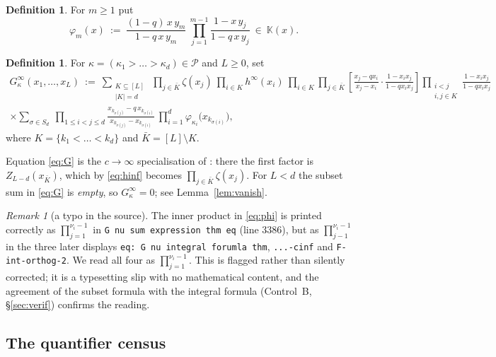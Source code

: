 \documentclass[11pt]{article}
\theoremstyle{definition}
\newtheorem{defn}[thm]{Definition}
\theoremstyle{remark}
\newtheorem{rem}[thm]{Remark}
\newcommand{\KK}{\mathbb{K}}
\newcommand{\PP}{\mathcal{P}}
\newcommand{\Gi}[1]{G^{\infty}_{#1}}
\begin{document}
\begin{defn}\label{def:phi}
For $m\ge 1$ put
\begin{equation}\label{eq:phi}
  \varphi_m(x)\ :=\ \frac{(1-q)\,x\,y_m}{1-q\,x\,y_m}\ \prod_{j=1}^{m-1}\frac{1-x\,y_j}{1-q\,x\,y_j}
  \ \in\ \KK(x).
\end{equation}
\end{defn}

\begin{defn}\label{def:G}
For $\kappa=(\kappa_1>\dots>\kappa_d)\in\PP$ and $L\ge 0$, set
\begin{multline}\label{eq:G}
  \Gi{\kappa}(x_1,\dots,x_L)\ :=\
  \sum_{\substack{K\subseteq[L]\\ |K|=d}}
  \ \prod_{j\in\bar K}\zeta(x_j)\ \prod_{i\in K}h^\infty(x_i)
  \ \prod_{i\in K}\prod_{j\in\bar K}
     \left[\frac{x_j-qx_i}{x_j-x_i}\cdot\frac{1-x_ix_j}{1-qx_ix_j}\right]
  \prod_{\substack{i<j\\ i,j\in K}}\frac{1-x_ix_j}{1-qx_ix_j}
  \\[2pt]
  \times \sum_{\sigma\in S_d}\ \prod_{1\le i<j\le d}
     \frac{x_{k_{\sigma(j)}}-q\,x_{k_{\sigma(i)}}}{x_{k_{\sigma(j)}}-x_{k_{\sigma(i)}}}
  \ \prod_{i=1}^{d}\varphi_{\kappa_i}\bigl(x_{k_{\sigma(i)}}\bigr),
\end{multline}
where $K=\{k_1<\dots<k_d\}$ and $\bar K=[L]\setminus K$.
\end{defn}

Equation \eqref{eq:G} is the $c\to\infty$ specialisation of \cite[Theorem \texttt{G nu thm},
line 3386]{GDMW}: there the first factor is $Z_{L-d}(x_{\bar K})$, which by \eqref{eq:hinf}
becomes $\prod_{j\in\bar K}\zeta(x_j)$. For $L<d$ the subset sum in \eqref{eq:G} is
\emph{empty}, so $\Gi{\kappa}=0$; see Lemma~\ref{lem:vanish}.

\begin{rem}[a typo in the source]\label{rem:typo}
The inner product in \eqref{eq:phi} is printed correctly as $\prod_{j=1}^{\nu_i-1}$ in
\texttt{G nu sum expression thm eq} (line 3386), but as $\prod_{j-1}^{\nu_i-1}$ in the three
later displays \texttt{eq: G nu integral forumla thm}, \texttt{...-cinf} and
\texttt{F-int-orthog-2}. We read all four as $\prod_{j=1}^{\nu_i-1}$. This is flagged rather
than silently corrected; it is a typesetting slip with no mathematical content, and the
agreement of the subset formula with the integral formula (Control~B, \S\ref{sec:verif})
confirms the reading.
\end{rem}

\subsection{The quantifier census}\label{sec:census}
\end{document}
